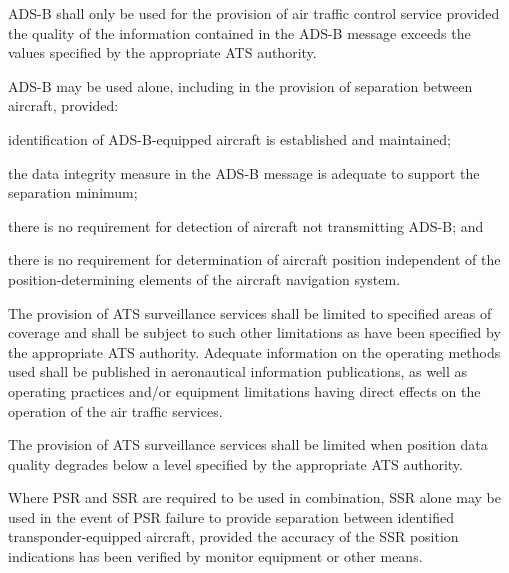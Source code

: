 \begin{enumnoss}
    \item ADS-B shall only be used for the provision of air traffic control service provided the quality of the information contained in the ADS-B message exceeds the values specified by the appropriate ATS authority.
    \item ADS-B may be used alone, including in the provision of separation between aircraft, provided:

    \begin{enumalph}
        \item identification of ADS-B-equipped aircraft is established and maintained;
        \item the data integrity measure in the ADS-B message is adequate to support the separation minimum;
        \item there is no requirement for detection of aircraft not transmitting ADS-B; and
        \item there is no requirement for determination of aircraft position independent of the position-deter\-mining elements of the aircraft navigation system.
    \end{enumalph}

    \item The provision of ATS surveillance services shall be limited to specified areas of coverage and shall be subject to such other limitations as have been specified by the appropriate ATS authority. Adequate information on the operating methods used shall be published in aeronautical information publications, as well as operating practices and/or equipment limitations having direct effects on the operation of the air traffic services.

    \begin{enumnoss}
        \item The provision of ATS surveillance services shall be limited when position data quality degrades below a level specified by the appropriate ATS authority.
    \end{enumnoss}

    \item Where PSR and SSR are required to be used in combination, SSR alone may be used in the event of PSR failure to provide separation between identified transponder-equipped aircraft, provided the accuracy of the SSR position indications has been verified by monitor equipment or other means.
\end{enumnoss}

